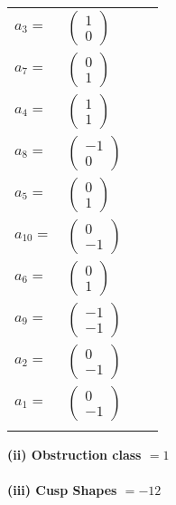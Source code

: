 \documentclass[1p]{elsarticle_modified}
\theoremstyle{definition}
\begin{document}
\begin{tabular}{m{7pt} m{180pt} m{7pt} m{180pt} }
\flushright $a_{3}=$&$\begin{pmatrix}1\\0\end{pmatrix}$ \\
\flushright $a_{7}=$&$\begin{pmatrix}0\\1\end{pmatrix}$ \\
\flushright $a_{4}=$&$\begin{pmatrix}1\\1\end{pmatrix}$ \\
\flushright $a_{8}=$&$\begin{pmatrix}-1\\0\end{pmatrix}$ \\
\flushright $a_{5}=$&$\begin{pmatrix}0\\1\end{pmatrix}$ \\
\flushright $a_{10}=$&$\begin{pmatrix}0\\-1\end{pmatrix}$ \\
\flushright $a_{6}=$&$\begin{pmatrix}0\\1\end{pmatrix}$ \\
\flushright $a_{9}=$&$\begin{pmatrix}-1\\-1\end{pmatrix}$ \\
\flushright $a_{2}=$&$\begin{pmatrix}0\\-1\end{pmatrix}$ \\
\flushright $a_{1}=$&$\begin{pmatrix}0\\-1\end{pmatrix}$\\&\end{tabular}
\flushleft \textbf{(ii) Obstruction class $= 1$}\\~\\
\flushleft \textbf{(iii) Cusp Shapes $= -12$}\\~\\
\end{document}

